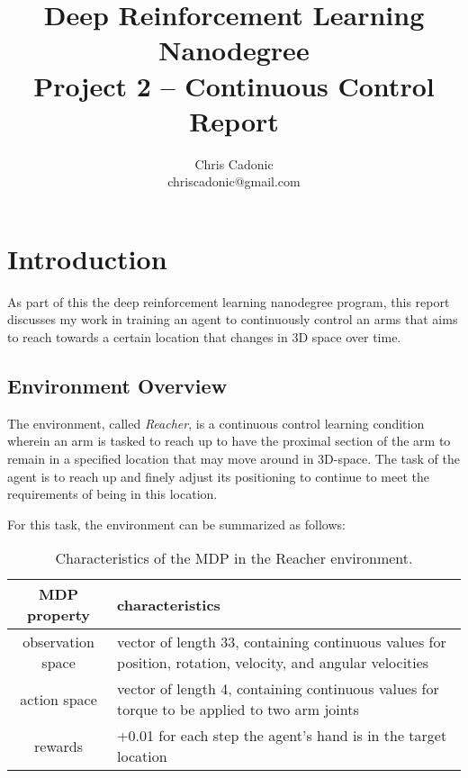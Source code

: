 \documentclass[11pt]{article}
\begin{document}
	
	\title{Deep Reinforcement Learning Nanodegree\\
		Project 2 -- Continuous Control Report}
	\author{\vspace{-1mm}Chris Cadonic\\
		chriscadonic@gmail.com}
	\maketitle
	\vspace{-1.5em}
	
	\section{Introduction}
	
	As part of this the deep reinforcement learning nanodegree program, this report discusses my work in training an agent to continuously control an arms that aims to reach towards a certain location that changes in 3D space over time.
	
	\subsection{Environment Overview}
	
	The environment, called \textit{Reacher}, is a continuous control learning condition wherein an arm is tasked to reach up to have the proximal section of the arm to remain in a specified location that may move around in 3D-space. The task of the agent is to reach up and finely adjust its positioning to continue to meet the requirements of being in this location.
	
	For this task, the environment can be summarized as follows:
	
	\begin{table}[!ht]
		\centering
		\begin{tabular}{ c | p{10cm} }
			\textbf{MDP property} & \textbf{characteristics} \\
			\hline
			observation space & vector of length 33, containing continuous values for position, rotation, velocity, and angular velocities \\
			\hline
			action space & vector of length 4, containing continuous values for torque to be applied to two arm joints \\
			\hline
			rewards & +0.01 for each step the agent's hand is in the target location \\
			\hline
		\end{tabular}
		\caption{Characteristics of the MDP in the Reacher environment.}
		\label{tbl:mdp}
	\end{table}
	
\end{document}
